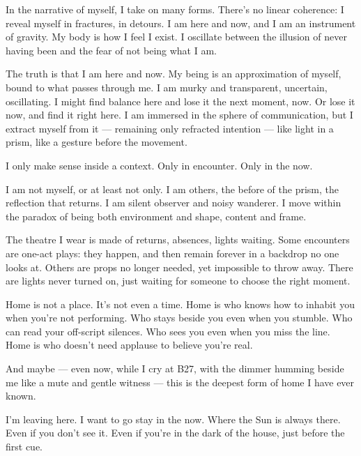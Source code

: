 {In the narrative of myself, I take on many forms.
There’s no linear coherence: I reveal myself in fractures, in detours.
I am here and now, and I am an instrument of gravity.
My body is how I feel I exist.
I oscillate between the illusion of never having been
and the fear of not being what I am.

The truth is that I am here and now.
My being is an approximation of myself, bound to what passes through me.
I am murky and transparent, uncertain, oscillating.
I might find balance here and lose it the next moment, now.
Or lose it now, and find it right here.
I am immersed in the sphere of communication, but I extract myself from it —
remaining only refracted intention —
like light in a prism, like a gesture before the movement.

I only make sense inside a context. Only in encounter. Only in the now.

I am not myself, or at least not only.
I am others, the before of the prism, the reflection that returns.
I am silent observer and noisy wanderer.
I move within the paradox of being both environment and shape, content and frame.

The theatre I wear is made of returns, absences, lights waiting.
Some encounters are one-act plays: they happen, and then remain forever in a backdrop no one looks at.
Others are props no longer needed, yet impossible to throw away.
There are lights never turned on, just waiting for someone to choose the right moment.

Home is not a place.
It’s not even a time.
Home is who knows how to inhabit you when you’re not performing.
Who stays beside you even when you stumble.
Who can read your off-script silences.
Who sees you even when you miss the line.
Home is who doesn’t need applause to believe you’re real.

And maybe — even now, while I cry at B27,
with the dimmer humming beside me like a mute and gentle witness —
this is the deepest form of home I have ever known.

I’m leaving here.
I want to go stay in the now.
Where the Sun is always there.
Even if you don’t see it.
Even if you’re in the dark of the house, just before the first cue.}


